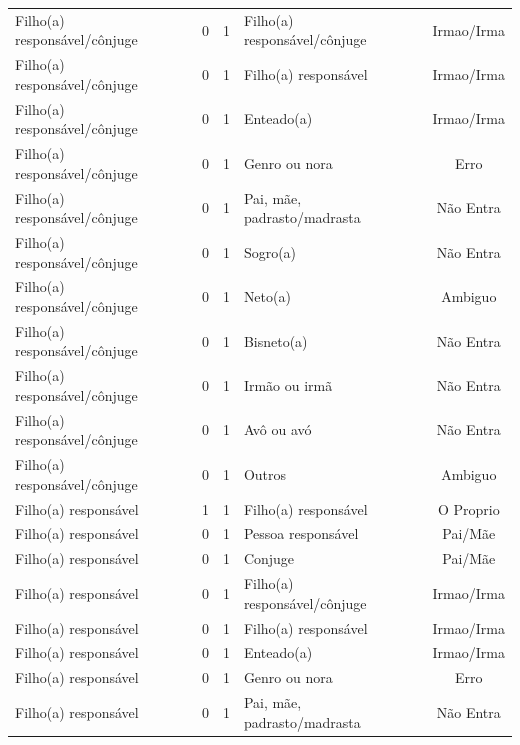 \documentclass[
	12pt,				%
	openright,			%
	twoside,			%
	a4paper,			%
	english,			%
	french,				%
	spanish,			%
	brazil				%
	]{abntex2}
\begin{document}
\begin{anexosenv}
\begin{longtable}{@{}lcclc@{}}
Filho(a) responsável/cônjuge & 0         & 1        & Filho(a) responsável/cônjuge & Irmao/Irma      \\
Filho(a) responsável/cônjuge & 0         & 1        & Filho(a) responsável         & Irmao/Irma      \\
Filho(a) responsável/cônjuge & 0         & 1        & Enteado(a)                   & Irmao/Irma      \\
Filho(a) responsável/cônjuge & 0         & 1        & Genro ou nora                & Erro            \\
Filho(a) responsável/cônjuge & 0         & 1        & Pai, mãe, padrasto/madrasta  & Não Entra       \\
Filho(a) responsável/cônjuge & 0         & 1        & Sogro(a)                     & Não Entra       \\
Filho(a) responsável/cônjuge & 0         & 1        & Neto(a)                      & Ambiguo         \\
Filho(a) responsável/cônjuge & 0         & 1        & Bisneto(a)                   & Não Entra       \\
Filho(a) responsável/cônjuge & 0         & 1        & Irmão ou irmã                & Não Entra       \\
Filho(a) responsável/cônjuge & 0         & 1        & Avô ou avó                   & Não Entra       \\
Filho(a) responsável/cônjuge & 0         & 1        & Outros                       & Ambiguo         \\
Filho(a) responsável         & 1         & 1        & Filho(a) responsável         & O Proprio       \\
Filho(a) responsável         & 0         & 1        & Pessoa responsável           & Pai/Mãe         \\
Filho(a) responsável         & 0         & 1        & Conjuge                      & Pai/Mãe         \\
Filho(a) responsável         & 0         & 1        & Filho(a) responsável/cônjuge & Irmao/Irma      \\
Filho(a) responsável         & 0         & 1        & Filho(a) responsável         & Irmao/Irma      \\
Filho(a) responsável         & 0         & 1        & Enteado(a)                   & Irmao/Irma      \\
Filho(a) responsável         & 0         & 1        & Genro ou nora                & Erro            \\
Filho(a) responsável         & 0         & 1        & Pai, mãe, padrasto/madrasta  & Não Entra       \\

\end{longtable}
\end{anexosenv}
\end{document}
